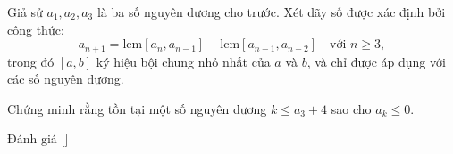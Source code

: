 \ifshowproblem
\begin{problem}\label{problem:IRN-2015-TST3-P2}
	Giả sử \( a_1, a_2, a_3 \) là ba số nguyên dương cho trước. Xét dãy số được xác định bởi công thức:
	\[
		a_{n+1} = \text{lcm}[a_n, a_{n-1}] - \text{lcm}[a_{n-1}, a_{n-2}] \quad \text{với } n \geq 3,
	\]
	trong đó \( [a, b] \) ký hiệu bội chung nhỏ nhất của \( a \) và \( b \), và chỉ được áp dụng với các số nguyên dương.

	Chứng minh rằng tồn tại một số nguyên dương \( k \leq a_3 + 4 \) sao cho \( a_k \leq 0 \).
\end{problem}
\fi

\ifshowinfo
Đánh giá [\textbf{}]\footnotemark
{}
\fi